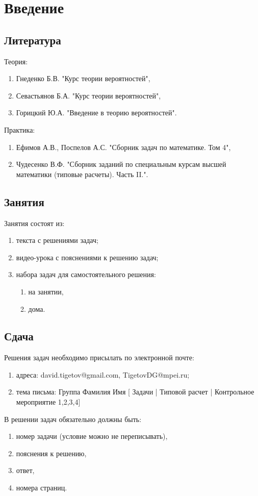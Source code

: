\chapter{Введение}


\section*{Литература}

Теория:
\begin{enumerate}
    \item Гнеденко Б.В. "Курс теории вероятностей"{},
    \item Севастьянов Б.А. "Курс теории вероятностей"{},
    \item Горицкий Ю.А. "Введение в теорию вероятностей"{}.
\end{enumerate}

Практика:
\begin{enumerate}
    \item Ефимов А.В., Поспелов А.С. "Сборник задач по математике. Том 4"{},
    \item Чудесенко В.Ф. "Сборник заданий по специальным курсам высшей математики (типовые расчеты). Часть II."{}.
\end{enumerate}


\section*{Занятия}

Занятия состоят из:
\begin{enumerate}
    \item текста с решениями задач;
    \item видео-урока с пояснениями к решению задач;
    \item набора задач для самостоятельного решения:
    \begin{enumerate}
        \item на занятии,
        \item дома.
    \end{enumerate}
\end{enumerate}


\section*{Сдача}

Решения задач необходимо присылать по электронной почте:
\begin{enumerate}
    \item адреса: david.tigetov@gmail.com, TigetovDG@mpei.ru;
    \item тема письма: Группа Фамилия Имя [ Задачи | Типовой расчет | Контрольное мероприятие {1,2,3,4}]
\end{enumerate}

В решении задач обязательно должны быть:
\begin{enumerate}
    \item номер задачи (условие можно не переписывать),
    \item пояснения к решению,
    \item ответ,
    \item номера страниц.
\end{enumerate}